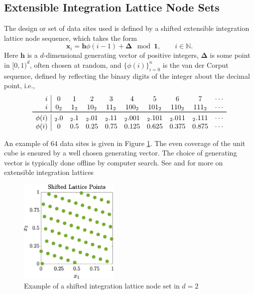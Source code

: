 \documentclass[twocolumn]{svjour3}          %
\newcommand{\bm}[1]{\boldsymbol{#1}}
\newcommand{\naturals}{\mathbb{N}}
\newcommand{\vDelta}{{\boldsymbol{\Delta}}}
\newcommand{\vh}{\bm{h}}
\newcommand{\vx}{\bm{x}}
\newcommand{\vone}{\bm{1}}
\begin{document}
\subsection{Extensible Integration Lattice Node Sets}

The design or set of data sites used is defined by a shifted extensible integration lattice node sequence, which takes the form
\begin{equation}
\vx_{i} = \vh \phi(i-1) + \vDelta \mod \vone, \qquad i \in \naturals.
\end{equation} 
Here $\vh$ is a $d$-dimensional generating vector of positive integers, $\vDelta$ is some point in $[0,1)^d$, often chosen at random, and $\{\phi(i)\}_{i=0}^n$ is the van der Corput sequence, defined by reflecting the binary digits of the integer about the decimal point, i.e., 
\begin{equation} \label{vdCDef}
\begin{array}{r|ccccccccccccc}
i & 0 & 1 & 2 & 3 & 4 &  5 & 6 & 7 & \cdots \\
i & 0_2 & 1_2 & 10_2 & 11_2 & 100_2 & 101_2 & 110_2 & 111_2  & \cdots\\
\toprule
\phi(i) & {}_2.0 &  {}_2.1 & {}_2.01 &  {}_2.11  & {}_2.001 &  {}_2.101 & {}_2.011 &  {}_2.111 & \cdots\\
\phi(i) & 0 &  0.5 &  0.25 & 0.75 &  0.125 & 0.625  &  0.375 & 0.875 & \cdots
\end{array}
\end{equation}


An example of $64$ data sites is given in Figure  \ref{latticefig}.  The even coverage of the unit cube is ensured by a well chosen generating vector.  The choice of generating vector is typically done offline by computer search.  See \cite{DicEtal14a} and \cite{HicNie03a} for more on extensible integration lattices 
\begin{figure}[htp]
	\centering
	\includegraphics[height=5cm]{ShiftedLatticePoints}
	\caption{Example of a shifted integration lattice node set  in $d=2$ \label{latticefig} }
\end{figure}
\end{document}
